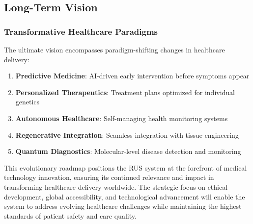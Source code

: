 \subsection{Long-Term Vision}

\subsubsection{Transformative Healthcare Paradigms}
The ultimate vision encompasses paradigm-shifting changes in healthcare delivery:

\begin{enumerate}
    \item \textbf{Predictive Medicine}: AI-driven early intervention before symptoms appear
    \item \textbf{Personalized Therapeutics}: Treatment plans optimized for individual genetics
    \item \textbf{Autonomous Healthcare}: Self-managing health monitoring systems
    \item \textbf{Regenerative Integration}: Seamless integration with tissue engineering
    \item \textbf{Quantum Diagnostics}: Molecular-level disease detection and monitoring
\end{enumerate}

This evolutionary roadmap positions the RUS system at the forefront of medical technology innovation, ensuring its continued relevance and impact in transforming healthcare delivery worldwide. The strategic focus on ethical development, global accessibility, and technological advancement will enable the system to address evolving healthcare challenges while maintaining the highest standards of patient safety and care quality.

